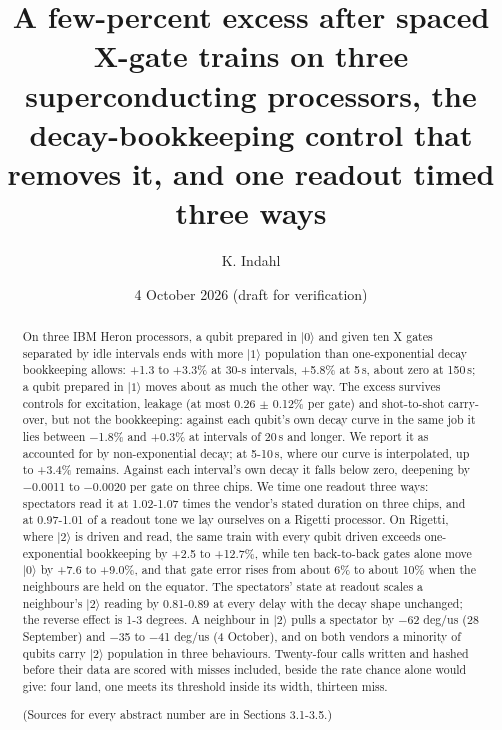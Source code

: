 \documentclass[11pt]{article}
\title{A few-percent excess after spaced X-gate trains on three superconducting processors, the decay-bookkeeping control that removes it, and one readout timed three ways}
\author{K. Indahl}
\date{4 October 2026 (draft for verification)}
\begin{document}
\maketitle
{}\par\medskip
\begin{abstract}
On three IBM Heron processors, a qubit prepared in \(|0\rangle\) and given ten X gates separated by idle intervals ends with more \(|1\rangle\) population than one-exponential decay bookkeeping allows: +1.3 to +3.3\% at 30-\textmu s intervals, +5.8\% at 5\,\textmu s, about zero at 150\,\textmu s; a qubit prepared in \(|1\rangle\) moves about as much the other way. The excess survives controls for excitation, leakage (at most 0.26 \(\pm\) 0.12\% per gate) and shot-to-shot carry-over, but not the bookkeeping: against each qubit's own decay curve in the same job it lies between \(-\)1.8\% and +0.3\% at intervals of 20\,\textmu s and longer. We report it as accounted for by non-exponential decay; at 5-10\,\textmu s, where our curve is interpolated, up to +3.4\% remains. Against each interval's own decay it falls below zero, deepening by \(-\)0.0011 to \(-\)0.0020 per gate on three chips. We time one readout three ways: spectators read it at 1.02-1.07 times the vendor's stated duration on three chips, and at 0.97-1.01 of a readout tone we lay ourselves on a Rigetti processor. On Rigetti, where \(|2\rangle\) is driven and read, the same train with every qubit driven exceeds one-exponential bookkeeping by +2.5 to +12.7\%, while ten back-to-back gates alone move \(|0\rangle\) by +7.6 to +9.0\%, and that gate error rises from about 6\% to about 10\% when the neighbours are held on the equator. The spectators' state at readout scales a neighbour's \(|2\rangle\) reading by 0.81-0.89 at every delay with the decay shape unchanged; the reverse effect is 1-3 degrees. A neighbour in \(|2\rangle\) pulls a spectator by \(-\)62 deg/us (28 September) and \(-\)35 to \(-\)41 deg/us (4 October), and on both vendors a minority of qubits carry \(|2\rangle\) population in three behaviours. Twenty-four calls written and hashed before their data are scored with misses included, beside the rate chance alone would give: four land, one meets its threshold inside its width, thirteen miss.

(Sources for every abstract number are in Sections 3.1-3.5.)

\end{abstract}
\end{document}
